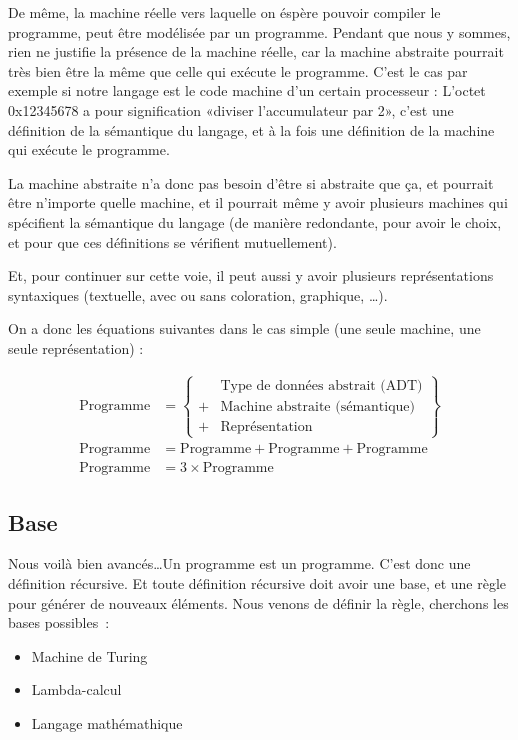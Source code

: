 \documentclass{article}
\begin{document}
De même, la machine réelle vers laquelle on éspère pouvoir compiler le programme, peut être modélisée par un programme. Pendant que nous y sommes, rien ne justifie la présence de la machine réelle, car la machine abstraite pourrait très bien être la même que celle qui exécute le programme. C'est le cas par exemple si notre langage est le code machine d'un certain processeur : L'octet 0x12345678 a pour signification «diviser l'accumulateur par 2», c'est une définition de la sémantique du langage, et à la fois une définition de la machine qui exécute le programme.

La machine abstraite n'a donc pas besoin d'être si abstraite que ça, et pourrait être n'importe quelle machine, et il pourrait même y avoir plusieurs machines qui spécifient la sémantique du langage (de manière redondante, pour avoir le choix, et pour que ces définitions se vérifient mutuellement).

Et, pour continuer sur cette voie, il peut aussi y avoir plusieurs représentations syntaxiques (textuelle, avec ou sans coloration, graphique, \dots).

On a donc les équations suivantes dans le cas simple (une seule machine, une seule représentation) :

\begin{align}
  \text{Programme} &= \left\lbrace
      \begin{array}{rl}
          &\text{Type de données abstrait (ADT)}\\
        + &\text{Machine abstraite (sémantique)}\\
        + &\text{Représentation}
      \end{array}
      \right\rbrace\\
  \text{Programme} &= \text{Programme} + \mathrm{Programme} + \mathrm{Programme}\\
  \text{Programme} &= 3 \times \text{Programme}
\end{align}

\subsection{Base}

Nous voilà bien avancés\dots Un programme est un programme. C'est donc une définition récursive. Et toute définition récursive doit avoir une base, et une règle pour générer de nouveaux éléments. Nous venons de définir la règle, cherchons les bases possibles~:
\begin{itemize}
\item Machine de Turing
\item Lambda-calcul
\item Langage mathémathique
\end{itemize}
\end{document}
